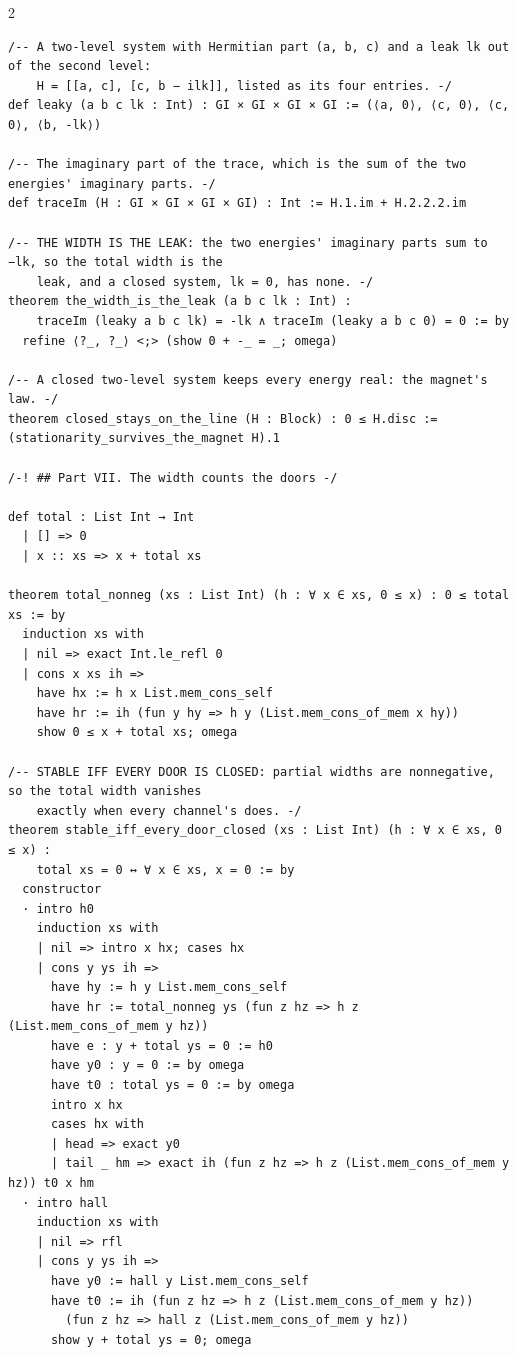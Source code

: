 \documentclass[10pt]{article}
\begin{document}
\begin{multicols}{2}
\begin{Verbatim}[fontsize=\fontsize{5.9}{6.8}\selectfont,breaklines,breakanywhere,breaksymbolleft={}]
/-- A two-level system with Hermitian part (a, b, c) and a leak lk out of the second level:
    H = [[a, c], [c, b − ilk]], listed as its four entries. -/
def leaky (a b c lk : Int) : GI × GI × GI × GI := (⟨a, 0⟩, ⟨c, 0⟩, ⟨c, 0⟩, ⟨b, -lk⟩)

/-- The imaginary part of the trace, which is the sum of the two energies' imaginary parts. -/
def traceIm (H : GI × GI × GI × GI) : Int := H.1.im + H.2.2.2.im

/-- THE WIDTH IS THE LEAK: the two energies' imaginary parts sum to −lk, so the total width is the
    leak, and a closed system, lk = 0, has none. -/
theorem the_width_is_the_leak (a b c lk : Int) :
    traceIm (leaky a b c lk) = -lk ∧ traceIm (leaky a b c 0) = 0 := by
  refine ⟨?_, ?_⟩ <;> (show 0 + -_ = _; omega)

/-- A closed two-level system keeps every energy real: the magnet's law. -/
theorem closed_stays_on_the_line (H : Block) : 0 ≤ H.disc := (stationarity_survives_the_magnet H).1

/-! ## Part VII. The width counts the doors -/

def total : List Int → Int
  | [] => 0
  | x :: xs => x + total xs

theorem total_nonneg (xs : List Int) (h : ∀ x ∈ xs, 0 ≤ x) : 0 ≤ total xs := by
  induction xs with
  | nil => exact Int.le_refl 0
  | cons x xs ih =>
    have hx := h x List.mem_cons_self
    have hr := ih (fun y hy => h y (List.mem_cons_of_mem x hy))
    show 0 ≤ x + total xs; omega

/-- STABLE IFF EVERY DOOR IS CLOSED: partial widths are nonnegative, so the total width vanishes
    exactly when every channel's does. -/
theorem stable_iff_every_door_closed (xs : List Int) (h : ∀ x ∈ xs, 0 ≤ x) :
    total xs = 0 ↔ ∀ x ∈ xs, x = 0 := by
  constructor
  · intro h0
    induction xs with
    | nil => intro x hx; cases hx
    | cons y ys ih =>
      have hy := h y List.mem_cons_self
      have hr := total_nonneg ys (fun z hz => h z (List.mem_cons_of_mem y hz))
      have e : y + total ys = 0 := h0
      have y0 : y = 0 := by omega
      have t0 : total ys = 0 := by omega
      intro x hx
      cases hx with
      | head => exact y0
      | tail _ hm => exact ih (fun z hz => h z (List.mem_cons_of_mem y hz)) t0 x hm
  · intro hall
    induction xs with
    | nil => rfl
    | cons y ys ih =>
      have y0 := hall y List.mem_cons_self
      have t0 := ih (fun z hz => h z (List.mem_cons_of_mem y hz))
        (fun z hz => hall z (List.mem_cons_of_mem y hz))
      show y + total ys = 0; omega


\end{Verbatim}
\end{multicols}
\end{document}
